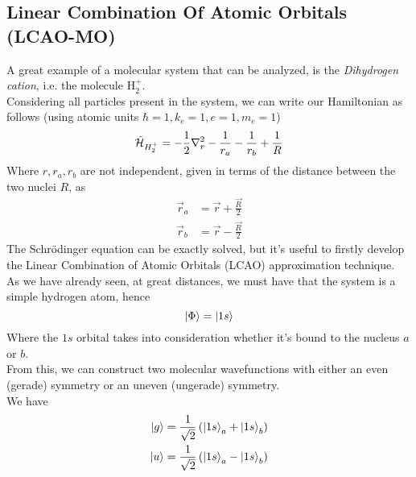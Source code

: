 \documentclass[../qm.tex]{subfiles}
\begin{document}
	\subsection{Linear Combination Of Atomic Orbitals (LCAO-MO)}
	A great example of a molecular system that can be analyzed, is the \textit{Dihydrogen cation}, i.e. the molecule $\mathrm{H}_2^+$.\\
	Considering all particles present in the system, we can write our Hamiltonian as follows (using atomic units $\hbar=1,k_e=1,e=1,m_e=1$)
	\begin{equation}
		\hat{\mathcal{H}}_{H_2^+}=-\frac{1}{2}\nabla^2_r-\frac{1}{r_a}-\frac{1}{r_b}+\frac{1}{R}
		\label{eq:h2plusham}
	\end{equation}
	Where $r,r_a,r_b$ are not independent, given in terms of the distance between the two nuclei $R$, as
	\begin{equation*}
		\begin{aligned}
			\vec{r}_a&=\vec{r}+\frac{\vec{R}}{2}\\
			\vec{r}_b&=\vec{r}-\frac{\vec{R}}{2}
		\end{aligned}
	\end{equation*}
	The Schrödinger equation can be exactly solved, but it's useful to firstly develop the Linear Combination of Atomic Orbitals (LCAO) approximation technique.\\
	As we have already seen, at great distances, we must have that the system is a simple hydrogen atom, hence
	\begin{equation*}
		\ket{\Phi}=\ket{1s}
	\end{equation*}
	Where the $1s$ orbital takes into consideration whether it's bound to the nucleus $a$ or $b$.\\
	From this, we can construct two molecular wavefunctions with either an even (gerade) symmetry or an uneven (ungerade) symmetry.\\
	We have
	\begin{equation}
		\begin{aligned}
			\ket{g}&=\frac{1}{\sqrt{2}}\left( \ket{1s}_a+\ket{1s}_b \right)\\
			\ket{u}&=\frac{1}{\sqrt{2}}\left( \ket{1s}_a-\ket{1s}_b \right)
		\end{aligned}
		\label{eq:geradeungeradewfh2plus}
	\end{equation}
\end{document}
